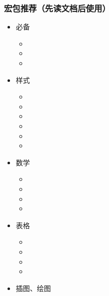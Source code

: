 \begin{frame}[fragile]
  \frametitle{宏包推荐（\textbf{先读文档}后使用）}
  \setlength{\leftmarginii}{1.5em}
  \vspace{-1.5em}
  \begin{multicols}{3}
    \begin{itemize}
      \item 必备

        \begin{itemize}
          \item {}
          \item {}
          \item {}
        \end{itemize}

      \item 样式

        \begin{itemize}
          \item {}
          \item {}
          \item {}
          \item {}
          \item {}
          \item {}
        \end{itemize}

      \item 数学

        \begin{itemize}
          \item {}
          \item {}
          \item {}
          \item {}
        \end{itemize}

      \item 表格

        \begin{itemize}
          \item {}
          \item {}
          \item {}
          \item {}
        \end{itemize}

      \item 插图、绘图


\end{itemize}
\end{multicols}
\end{frame}
